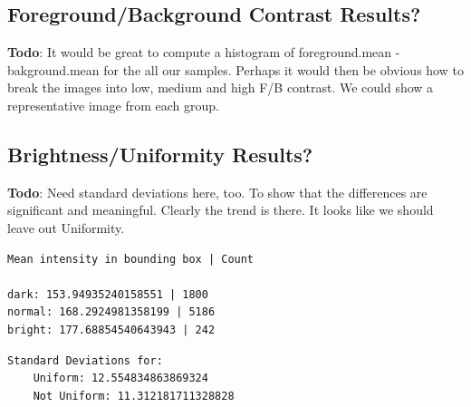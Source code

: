 \documentclass[conference]{IEEEtran}
\begin{document}
\subsection{Foreground/Background Contrast Results?}
\textbf{Todo}: It would be great to compute a histogram of foreground.mean -
bakground.mean for the all our samples.
Perhaps it would then be obvious how to break the images into low, medium
and high F/B contrast.  We could show a representative image from each
group.

\subsection{Brightness/Uniformity Results?}
\textbf{Todo}: Need standard deviations here, too. To show that the
differences are significant and meaningful. Clearly the trend is there.\newline
It looks like we should leave out Uniformity.

\begin{verbatim}
Mean intensity in bounding box | Count

dark: 153.94935240158551 | 1800
normal: 168.2924981358199 | 5186
bright: 177.68854540643943 | 242
\end{verbatim}
\begin{verbatim}
Standard Deviations for:
    Uniform: 12.554834863869324
    Not Uniform: 11.312181711328828
\end{verbatim}
\end{document}
